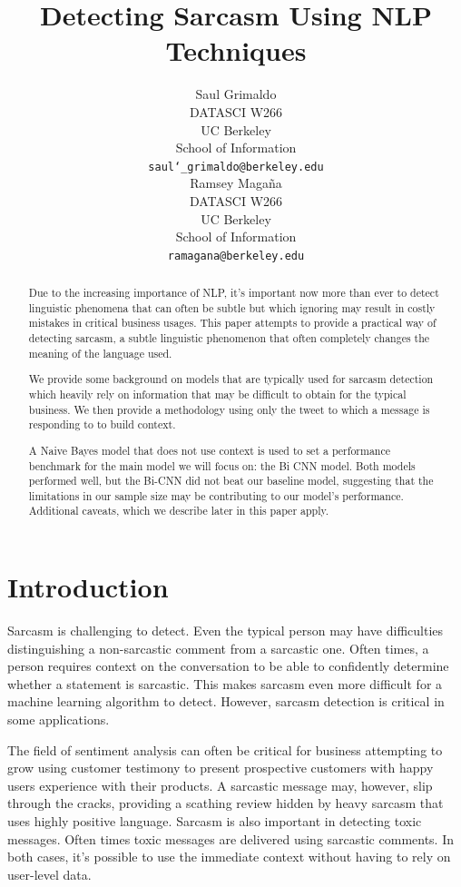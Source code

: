 \documentclass[11pt,a4paper]{article}
\title{Detecting Sarcasm Using NLP Techniques}
\author{Saul Grimaldo \\
  DATASCI W266\\
  UC Berkeley \\
  School of Information \\
  {\tt saul\char`_grimaldo@berkeley.edu} \\\And
  Ramsey Maga{\~n}a \\
  DATASCI W266\\
  UC Berkeley \\
  School of Information \\
  {\tt ramagana@berkeley.edu} \\}
\date{}
\begin{document}
\maketitle
\begin{abstract}
Due to the increasing importance of NLP, it's important now more than ever to detect linguistic phenomena that can often be subtle but which ignoring may result in costly mistakes in critical business usages. This paper attempts to provide a practical way of detecting sarcasm, a subtle linguistic phenomenon that often completely changes the meaning of the language used. 

We provide some background on models that are typically used for sarcasm detection which heavily rely on information that may be difficult to obtain for the typical business. We then provide a methodology using only the tweet to which a message is responding to to build context.

A Naive Bayes model that does not use context is used to set a performance benchmark for the main model we will focus on: the Bi CNN model. Both models performed well, but the Bi-CNN did not beat our baseline model, suggesting that the limitations in our sample size may be contributing to our model's performance. Additional caveats, which we describe later in this paper apply.

\end{abstract}

\section{Introduction}
Sarcasm is challenging to detect. Even the typical person may have difficulties distinguishing a non-sarcastic comment from a sarcastic one. Often times, a person requires context on the conversation to be able to confidently determine whether a statement is sarcastic. This makes sarcasm even more difficult for a machine learning algorithm to detect. However, sarcasm detection is critical in some applications. 

The field of sentiment analysis can often be critical for business attempting to grow using customer testimony to present prospective customers with happy users experience with their products. A sarcastic message may, however, slip through the cracks, providing a scathing review hidden by heavy sarcasm that uses highly positive language. Sarcasm is also important in detecting toxic messages. Often times toxic messages are delivered using sarcastic comments. In both cases, it's possible to use the immediate context without having to rely on user-level data.
\end{document}
